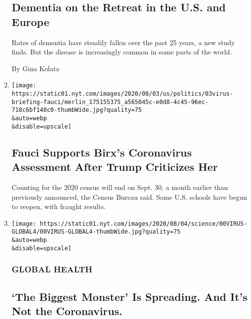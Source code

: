\begin{enumerate}
  \hypertarget{dementia-on-the-retreat-in-the-us-and-europe}{%
  \subsection{Dementia on the Retreat in the U.S. and
  Europe}\label{dementia-on-the-retreat-in-the-us-and-europe}}

  Rates of dementia have steadily fallen over the past 25 years, a new
  study finds. But the disease is increasingly common in some parts of
  the world.

  By Gina Kolata
\item
  \href{/2020/08/03/world/coronavirus-covid-19.html}{}

  \texttt{[image: https://static01.nyt.com/images/2020/08/03/us/politics/03virus-briefing-fauci/merlin\_175155375\_a565045c-e0d8-4c45-96ec-718c6bf140c0-thumbWide.jpg?quality=75\\\&auto=webp\\\&disable=upscale]}

  \hypertarget{fauci-supports-birxs-coronavirus-assessment-after-trump-criticizes-her}{%
  \subsection{Fauci Supports Birx's Coronavirus Assessment After Trump
  Criticizes
  Her}\label{fauci-supports-birxs-coronavirus-assessment-after-trump-criticizes-her}}

  Counting for the 2020 census will end on Sept. 30, a month earlier
  than previously announced, the Census Bureau said. Some U.S. schools
  have begun to reopen, with fraught results.
\item
  \href{/2020/08/03/health/coronavirus-tuberculosis-aids-malaria.html}{}

  \texttt{[image: https://static01.nyt.com/images/2020/08/04/science/00VIRUS-GLOBAL4/00VIRUS-GLOBAL4-thumbWide.jpg?quality=75\\\&auto=webp\\\&disable=upscale]}

  \hypertarget{global-health}{%
  \subsubsection{GLOBAL HEALTH}\label{global-health}}

  \hypertarget{the-biggest-monster-is-spreading-and-its-not-the-coronavirus}{%
  \subsection{`The Biggest Monster' Is Spreading. And It's Not the
  Coronavirus.}\label{the-biggest-monster-is-spreading-and-its-not-the-coronavirus}}


\end{enumerate}
